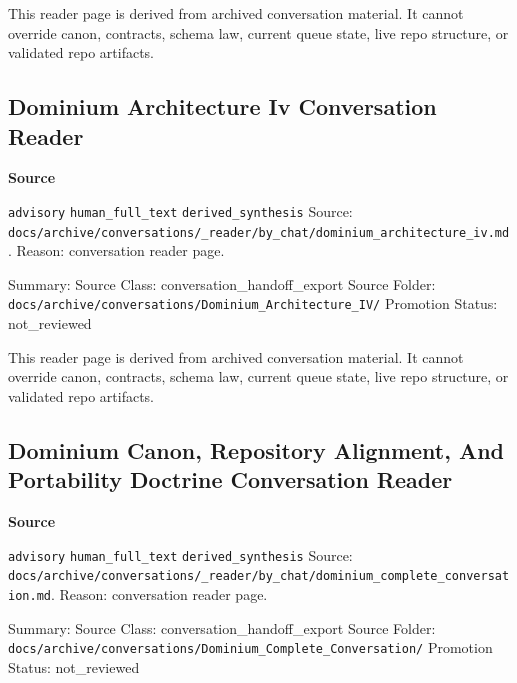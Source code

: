 \documentclass[9pt,a4paper,openany]{book}
\newcommand{\vonecallout}[3]{\par\medskip\noindent\begingroup\setlength{\fboxsep}{7pt}\colorbox{DomCalloutBg}{\parbox{0.94\linewidth}{\textbf{\textcolor{#1}{#2}}\par #3}}\endgroup\par\medskip}
\begin{document}
This reader page is derived from archived conversation material.\allowbreak{} It cannot override canon, contracts, schema law, current queue state, live repo structure, or validated repo artifacts.\allowbreak{}



\subsection{Dominium Architecture Iv Conversation Reader}

\vonecallout{DomSlate}{Source}{\texttt{advisory} \texttt{human\_\allowbreak{}full\_\allowbreak{}text} \texttt{derived\_\allowbreak{}synthesis} Source: \texttt{docs/\allowbreak{}archive/\allowbreak{}conversations/\allowbreak{}\_\allowbreak{}reader/\allowbreak{}by\_\allowbreak{}chat/\allowbreak{}dominium\_\allowbreak{}architecture\_\allowbreak{}iv.\allowbreak{}md}.\allowbreak{} Reason: conversation reader page.\allowbreak{}}

Summary: Source Class: conversation\_\allowbreak{}handoff\_\allowbreak{}export Source Folder: \texttt{docs/\allowbreak{}archive/\allowbreak{}conversations/\allowbreak{}Dominium\_\allowbreak{}Architecture\_\allowbreak{}IV/\allowbreak{}} Promotion Status: not\_\allowbreak{}reviewed


This reader page is derived from archived conversation material.\allowbreak{} It cannot override canon, contracts, schema law, current queue state, live repo structure, or validated repo artifacts.\allowbreak{}



\subsection{Dominium Canon, Repository Alignment, And Portability Doctrine Conversation Reader}

\vonecallout{DomSlate}{Source}{\texttt{advisory} \texttt{human\_\allowbreak{}full\_\allowbreak{}text} \texttt{derived\_\allowbreak{}synthesis} Source: \texttt{docs/\allowbreak{}archive/\allowbreak{}conversations/\allowbreak{}\_\allowbreak{}reader/\allowbreak{}by\_\allowbreak{}chat/\allowbreak{}dominium\_\allowbreak{}complete\_\allowbreak{}conversation.\allowbreak{}md}.\allowbreak{} Reason: conversation reader page.\allowbreak{}}

Summary: Source Class: conversation\_\allowbreak{}handoff\_\allowbreak{}export Source Folder: \texttt{docs/\allowbreak{}archive/\allowbreak{}conversations/\allowbreak{}Dominium\_\allowbreak{}Complete\_\allowbreak{}Conversation/\allowbreak{}} Promotion Status: not\_\allowbreak{}reviewed
\end{document}
